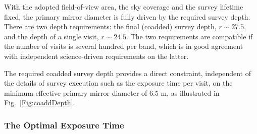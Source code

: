 \documentclass{emulateapj}
\begin{document}
With the adopted field-of-view area, the sky coverage and the survey lifetime 
fixed, the primary mirror diameter is fully driven by the required survey 
depth. There are two depth requirements: the final (coadded) survey depth, 
$r\sim27.5$, and the depth of a single visit, $r\sim24.5$. The two 
requirements are compatible if the number of visits is several hundred
per band, which is in good agreement with independent science-driven 
requirements on the latter.  

The required coadded survey depth provides a direct constraint, 
independent of the details of survey execution such as the exposure time per visit, 
on the minimum effective primary mirror diameter of 6.5 m, as illustrated in 
Fig.~\ref{Fig:coaddDepth}. 



\subsubsection{ The Optimal Exposure Time }
\end{document}
